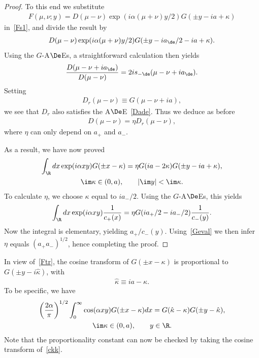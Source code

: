 \documentclass[pdftex]{sigma}
\numberwithin{equation}{section}
\begin{document}
\begin{proof}
To this end we substitute
\begin{gather}
F(\mu,\nu;y)=D(\mu-\nu)\exp(i\alpha (\mu+\nu)y/2)G(\pm y-ia+\kappa)
\end{gather}
in~\eqref{Fs1}, and divide the result by
\begin{gather}
D(\mu-\nu)\exp(i\alpha (\mu+\nu)y/2)G(\pm y-ia_{\de}/2-ia+\kappa).
\end{gather}
Using the $G$-A$\De$Es, a straightforward calculation then yields
\begin{gather}\label{Dade}
\frac{D(\mu-\nu+ia_{\de})}{D(\mu-\nu)}=2is_{-\de}(\mu-\nu+ia_{\de}).
\end{gather}
Setting
\begin{gather}
D_r(\mu-\nu)\equiv G(\mu-\nu+ia),
\end{gather}
we see that $D_r$ also satisf\/ies the A$\De$E~\eqref{Dade}. Thus we deduce as before
\begin{gather}
D(\mu-\nu)=\eta D_r(\mu-\nu),
\end{gather}
where $\eta$ can only depend on $a_{+}$ and $a_{-}$.

As a result, we have now proved
\begin{gather}\label{Ftr}
\int_{\R}dx\exp(i\alpha xy)G(\pm x-\kappa)=\eta G(ia-2\kappa)G(\pm y-ia+\kappa),\\
 \im \kappa \in (0,a),\qquad |\im y|<\im \kappa.\nonumber
\end{gather}
To calculate $\eta$, we choose $\kappa$ equal to $ia_{-}/2$. Using the $G$-A$\De$Es, this yields
\begin{gather}
\int_{\R}dx\exp(i\alpha xy)\frac{1}{c_{+}(x)}=\eta G(ia_{+}/2-ia_{-}/2)\frac{1}{c_{-}(y)}.
\end{gather}
Now the integral is elementary, yielding $a_{+}/c_{-}(y)$. Using~\eqref{Geval} we then infer $\eta$ equals $(a_{+}a_{-})^{1/2}$, hence completing the proof.
\end{proof}

In view of~\eqref{Ftr}, the cosine transform of $G(\pm x -\kappa)$ is proportional to $G(\pm y-i\hat{\kappa})$, with
\begin{gather}
\hat{\kappa}\equiv ia-\kappa.
\end{gather}
To be specif\/ic, we have
\begin{gather}\label{ckk}
\left(\frac{2\alpha}{\pi}\right)^{1/2}\int_{0}^{\infty}\cos(\alpha xy)G(\pm x-\kappa)dx=G(\hat{\kappa}-\kappa)G(\pm y -\hat{\kappa}),\\
 \im\kappa\in(0,a),\qquad y\in\R.\nonumber
\end{gather}
Note that the proportionality constant can now be checked by taking the cosine transform of~\eqref{ckk}.
\end{document}
